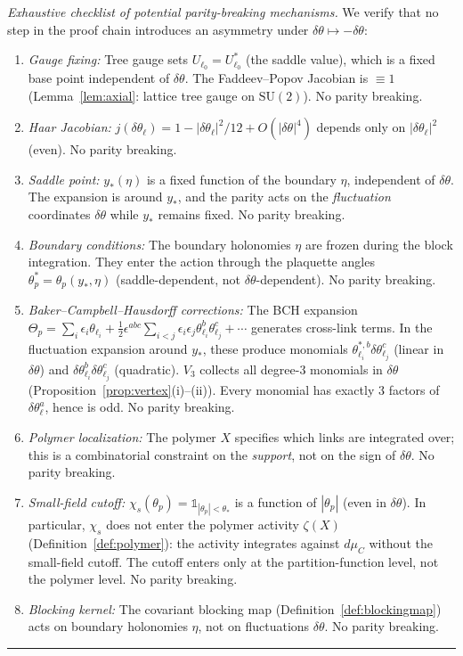 \documentclass[11pt]{article}
\theoremstyle{definition}
\newcommand{\SU}{\mathrm{SU}}
\begin{document}
\emph{Exhaustive checklist of potential parity-breaking mechanisms.}
We verify that no step in the proof chain introduces an
asymmetry under $\delta\theta\mapsto -\delta\theta$:
\begin{enumerate}[nosep,label=(P\arabic*)]
\item \emph{Gauge fixing:} Tree gauge sets
$U_{\ell_0}=U_{\ell_0}^*$ (the saddle value), which is a
fixed base point independent of $\delta\theta$.
The Faddeev--Popov Jacobian is $\equiv 1$
(Lemma~\ref{lem:axial}: lattice tree gauge on $\SU(2)$).
No parity breaking.
\item \emph{Haar Jacobian:}
$j(\delta\theta_\ell)=1-|\delta\theta_\ell|^2/12+O(|\delta\theta|^4)$
depends only on $|\delta\theta_\ell|^2$ (even).
No parity breaking.
\item \emph{Saddle point:} $y_*(\eta)$ is a fixed function of
the boundary $\eta$, independent of $\delta\theta$.
The expansion is around $y_*$, and the parity acts on
the \emph{fluctuation} coordinates $\delta\theta$ while
$y_*$ remains fixed.  No parity breaking.
\item \emph{Boundary conditions:} The boundary holonomies $\eta$
are frozen during the block integration.  They enter the
action through the plaquette angles $\theta_p^*=\theta_p(y_*,\eta)$
(saddle-dependent, not $\delta\theta$-dependent).
No parity breaking.
\item \emph{Baker--Campbell--Hausdorff corrections:}
The BCH expansion $\Theta_p=\sum_i\epsilon_i\theta_{\ell_i}
+\frac{1}{2}\epsilon^{abc}\sum_{i<j}\epsilon_i\epsilon_j
\theta_{\ell_i}^b\theta_{\ell_j}^c+\cdots$ generates
cross-link terms.  In the fluctuation expansion around $y_*$,
these produce monomials $\theta_{\ell_i}^{*,b}\delta\theta_{\ell_j}^c$
(linear in $\delta\theta$) and
$\delta\theta_{\ell_i}^b\delta\theta_{\ell_j}^c$ (quadratic).
$V_3$ collects all degree-3 monomials in $\delta\theta$
(Proposition~\ref{prop:vertex}(i)--(ii)).  Every monomial
has exactly 3 factors of $\delta\theta_\ell^a$, hence is odd.
No parity breaking.
\item \emph{Polymer localization:} The polymer $X$ specifies
which links are integrated over; this is a combinatorial
constraint on the \emph{support}, not on the sign of
$\delta\theta$.  No parity breaking.
\item \emph{Small-field cutoff:}
$\chi_s(\theta_p)=\mathbb{1}_{|\theta_p|<\theta_*}$ is a
function of $|\theta_p|$ (even in $\delta\theta$).
In particular, $\chi_s$ does not enter the polymer
activity $\zeta(X)$ (Definition~\ref{def:polymer}):
the activity integrates against $d\mu_C$ without the
small-field cutoff.  The cutoff enters only at the
partition-function level, not the polymer level.
No parity breaking.
\item \emph{Blocking kernel:} The covariant blocking map
(Definition~\ref{def:blockingmap}) acts on boundary holonomies
$\eta$, not on fluctuations $\delta\theta$.
No parity breaking.
\end{enumerate}
\smallskip\hrule\medskip
\end{document}
